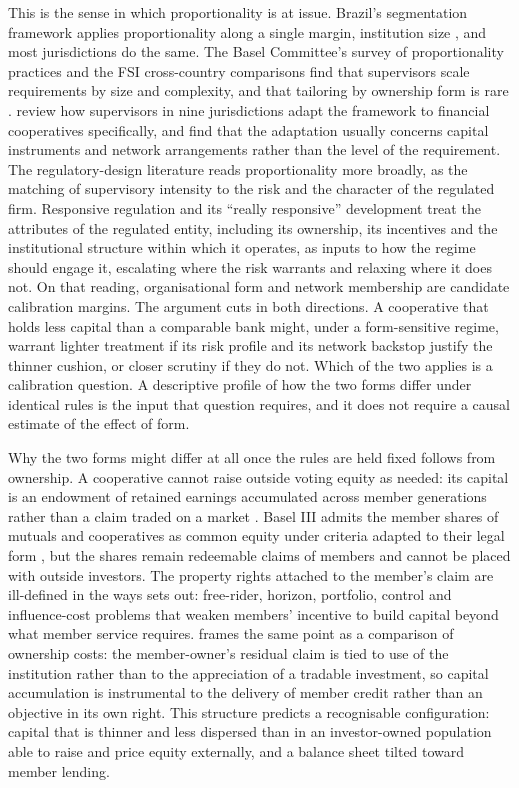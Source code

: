 \documentclass[11pt,a4paper]{article}
\begin{document}
This is the sense in which proportionality is at issue. Brazil's segmentation framework
applies proportionality along a single margin, institution size \citep{cmn4553}, and most
jurisdictions do the same. The Basel Committee's survey of proportionality practices and
the FSI cross-country comparisons find that supervisors scale requirements by size and
complexity, and that tailoring by ownership form is rare \citep{bcbs2019,
castrocarvalho2017, hohl2018}. \citet{coelho2019} review how supervisors in nine
jurisdictions adapt the framework to financial cooperatives specifically, and find that
the adaptation usually concerns capital instruments and network arrangements rather than
the level of the requirement. The regulatory-design literature reads proportionality more
broadly, as the matching of supervisory intensity to the risk and the character of the
regulated firm. Responsive regulation \citep{ayres1992} and its ``really responsive''
development \citep{baldwin2008} treat the attributes of the regulated entity, including
its ownership, its incentives and the institutional structure within which it operates,
as inputs to how the regime should engage it, escalating where the risk warrants and
relaxing where it does not. On that reading, organisational form and network membership
are candidate calibration margins. The argument cuts in both directions. A cooperative
that holds less capital than a comparable bank might, under a form-sensitive regime,
warrant lighter treatment if its risk profile and its network backstop justify the
thinner cushion, or closer scrutiny if they do not. Which of the two applies is a
calibration question. A descriptive profile of how the two forms differ under identical
rules is the input that question requires, and it does not require a causal estimate of
the effect of form.

Why the two forms might differ at all once the rules are held fixed follows from
ownership. A cooperative cannot raise outside voting equity as needed: its capital is an
endowment of retained earnings accumulated across member generations rather than a claim
traded on a market \citep{fonteyne2007}. Basel III admits the member shares of mutuals
and cooperatives as common equity under criteria adapted to their legal form
\citep{bcbs2011}, but the shares remain redeemable claims of members and cannot be placed
with outside investors. The property rights attached to the member's claim are
ill-defined in the ways \citet{cook1995} sets out: free-rider, horizon, portfolio,
control and influence-cost problems that weaken members' incentive to build capital
beyond what member service requires. \citet{hansmann1996} frames the same point as a
comparison of ownership costs: the member-owner's residual claim is tied to use of the
institution rather than to the appreciation of a tradable investment, so capital
accumulation is instrumental to the delivery of member credit rather than an objective in
its own right. This structure predicts a recognisable configuration: capital that is
thinner and less dispersed than in an investor-owned population able to raise and price
equity externally, and a balance sheet tilted toward member lending.
\end{document}
